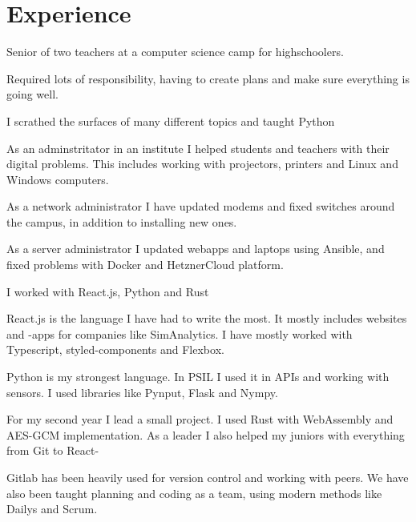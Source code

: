 \documentclass[]{plushcv}
\begin{document}
\begin{minipage}[t]{0.70\textwidth} 



\section{Experience}

\vspace{\topsep} %
\begin{tightemize}
\sectionsep
\item Senior of two teachers at a computer science camp for highschoolers.
\item Required lots of responsibility, having to create plans and make sure everything is going well.
\item I scrathed the surfaces of many different topics and taught Python
\end{tightemize}
\sectionsep

\begin{tightemize}
\sectionsep
\item As an adminstritator in an institute I helped students and teachers with their digital problems. This includes working with projectors, printers and Linux and Windows computers.
\item As a network administrator I have updated modems and fixed switches around the campus, in addition to installing new ones.
\item As a server administrator I updated webapps and laptops using Ansible, and fixed problems with Docker and HetznerCloud platform.
\end{tightemize}
\sectionsep

\begin{tightemize}
\sectionsep
\item I worked with React.js, Python and Rust
\item React.js is the language I have had to write the most. It mostly includes websites
and -apps for companies like SimAnalytics. I have mostly worked with Typescript, styled-components and Flexbox.
\item Python is my strongest language. In PSIL I used it in APIs and working with sensors. I used libraries like Pynput, Flask and Nympy.
\item For my second year I lead a small project. I used Rust with WebAssembly and AES-GCM implementation. As a leader I also helped my juniors with everything from Git to React-
\item Gitlab has been heavily used for version control and working with peers. We have also been taught planning and coding as a team, using modern methods like Dailys and Scrum.
\end{tightemize}
\sectionsep



\end{minipage}
\end{document}
